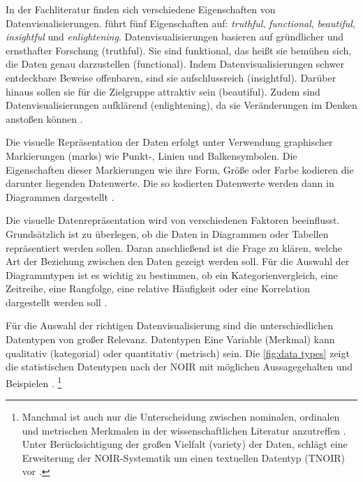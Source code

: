 In der Fachliteratur finden sich verschiedene Eigenschaften von Datenvisualisierungen. 
führt fünf Eigenschaften auf: \textit{truthful}, \textit{functional}, \textit{beautiful}, \textit{insightful} und \textit{enlightening}.
Datenvisualisierungen basieren auf gründlicher und ernsthafter Forschung (truthful). Sie sind funktional, das heißt
sie bemühen sich, die Daten genau darzustellen (functional). Indem Datenvisualisierungen schwer entdeckbare Beweise offenbaren, 
sind sie aufschlussreich (insightful). Darüber hinaus sollen sie für die Zielgruppe attraktiv sein (beautiful).
Zudem sind Datenvisualisierungen aufklärend (enlightening), da sie Veränderungen im Denken anstoßen können \cite[vgl.][45]{cairo_truthful_2016}. 

Die visuelle Repräsentation der Daten erfolgt unter Verwendung graphischer Markierungen (marks) wie Punkt-, 
Linien und Balkensymbolen. Die Eigenschaften dieser Markierungen wie ihre Form, Größe oder Farbe kodieren die
darunter liegenden Datenwerte. Die so kodierten Datenwerte werden dann in Diagrammen dargestellt \cite[vgl.][S. 135 ff.]{kirk_data_2019}.


Die visuelle Datenrepräsentation wird von verschiedenen Faktoren beeinflusst.
Grundsätzlich ist zu überlegen, ob die Daten in Diagrammen oder Tabellen repräsentiert werden sollen.
Daran anschließend ist die Frage zu klären, welche Art der Beziehung zwischen den Daten gezeigt werden soll.
Für die Auswahl der Diagrammtypen ist es wichtig zu bestimmen, ob ein Kategorienvergleich, eine Zeitreihe, eine Rangfolge, 
eine relative Häufigkeit oder eine Korrelation dargestellt werden soll \cite[vgl.][137]{few_show_2012}.

Für die Auswahl der richtigen Datenvisualisierung sind die unterschiedlichen Datentypen von großer Relevanz.
Datentypen  \cite[99]{kirk_data_2019}  Eine Variable (Merkmal) kann qualitativ (kategorial) oder quantitativ (metrisch) sein.
Die \autoref{fig:data types} zeigt die statistischen Datentypen nach der \acrfull{NOIR} 
mit möglichen Aussagegehalten und Beispielen \cite[vgl.][S. 12 ff.]{bortz_statistik_2010}.
\footnote{ Manchmal ist auch nur die Unterscheidung zwischen nominalen, ordinalen und metrischen
Merkmalen in der wissenschaftlichen Literatur anzutreffen \cite[vgl.][20]{cleff_deskriptive_2011}. 
Unter Berücksichtigung der großen Vielfalt (variety) der Daten, schlägt  
eine Erweiterung der \acrshort{NOIR}-Systematik um einen textuellen Datentyp (TNOIR) vor \cite[vgl.][100]{kirk_data_2019}.}

